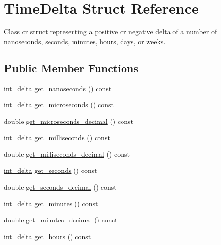 \hypertarget{structTimeDelta}{\section{\-Time\-Delta \-Struct \-Reference}
\label{structTimeDelta}
}


\-Class or struct representing a positive or negative delta of a number of nanoseconds, seconds, minutes, hours, days, or weeks.  


\subsection*{\-Public \-Member \-Functions}
\begin{DoxyCompactItemize}
\item 
\hyperlink{types_8h_a10729255b1946fd4fb654b2fe814910b}{int\-\_\-delta} \hyperlink{structTimeDelta_ac5f5521afb1b6118b34bf8987bd3b46f}{get\-\_\-nanoseconds} () const 
\item 
\hyperlink{types_8h_a10729255b1946fd4fb654b2fe814910b}{int\-\_\-delta} \hyperlink{structTimeDelta_aea0305bf51cadc48b987ff97454201a0}{get\-\_\-microseconds} () const 
\item 
double \hyperlink{structTimeDelta_ad4563212afb3c7e4307a900ceac74995}{get\-\_\-microseconds\-\_\-decimal} () const 
\item 
\hyperlink{types_8h_a10729255b1946fd4fb654b2fe814910b}{int\-\_\-delta} \hyperlink{structTimeDelta_a3cbd0c925ee1f8f0e028737643a830f6}{get\-\_\-milliseconds} () const 
\item 
double \hyperlink{structTimeDelta_ac7d647ea74d5b3abb8fdcfed1408d139}{get\-\_\-milliseconds\-\_\-decimal} () const 
\item 
\hyperlink{types_8h_a10729255b1946fd4fb654b2fe814910b}{int\-\_\-delta} \hyperlink{structTimeDelta_a30cec240d3ae960182b5ad473f1f426c}{get\-\_\-seconds} () const 
\item 
double \hyperlink{structTimeDelta_a8d5ce7355977a739fe2330472bf50965}{get\-\_\-seconds\-\_\-decimal} () const 
\item 
\hyperlink{types_8h_a10729255b1946fd4fb654b2fe814910b}{int\-\_\-delta} \hyperlink{structTimeDelta_a5f96f06d84489a75c4e52c76c682bd43}{get\-\_\-minutes} () const 
\item 
double \hyperlink{structTimeDelta_a9778c70f343b8238c30d72f79832ee68}{get\-\_\-minutes\-\_\-decimal} () const 
\item 
\hyperlink{types_8h_a10729255b1946fd4fb654b2fe814910b}{int\-\_\-delta} \hyperlink{structTimeDelta_ad2e561054006c1a65a3e610eaf8e6e5e}{get\-\_\-hours} () const 

\end{DoxyCompactItemize}
